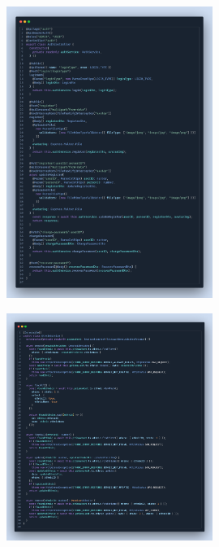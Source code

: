 \label{apendix:controladores-api}
\begin{figure}[H]
    \centering
    \includegraphics[width=0.6\textwidth]{chapters/appendices/code/controladores-api.png}
\end{figure}


\label{apendix:servicios-api}
\begin{figure}[H]
    \centering
    \includegraphics[width=0.6\textwidth]{chapters/appendices/code/servicios-api.png}
\end{figure}


